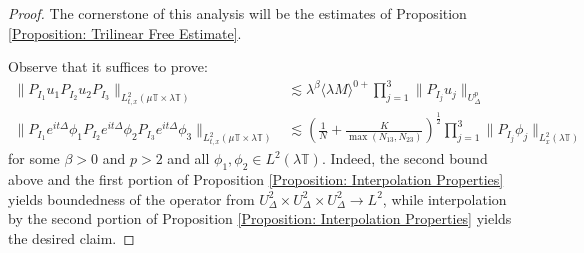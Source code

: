 \documentclass[12pt, letterpaper]{amsart}
\begin{document}
\begin{proof}
    The cornerstone of this analysis will be the estimates of Proposition \ref{Proposition: Trilinear Free Estimate}.

    Observe that it suffices to prove:
    \begin{align*}
        \|P_{I_1}u_1P_{I_2}u_2P_{I_3}\|_{L^2_{t,x}(\mu\mathbb{T}\times\lambda\mathbb{T})}&\lesssim \lambda^\beta \langle \lambda M\rangle^{0+}\prod_{j=1}^3\|P_{I_j}u_j\|_{U^p_\Delta}\\
        \|P_{I_1}e^{it\Delta}\phi_1P_{I_2}e^{it\Delta}\phi_2P_{I_3}e^{it\Delta}\phi_3\|_{L^2_{t,x}(\mu\mathbb{T}\times\lambda\mathbb{T})}&\lesssim \left(\frac{1}{N}+\frac{K}{\max(N_{13}, N_{23})}\right)^\frac{1}{2}\prod_{j=1}^3\|P_{I_j}\phi_j\|_{L^2_x(\lambda\mathbb{T})}
    \end{align*}
    for some $\beta > 0$ and $p > 2$ and all $\phi_1, \phi_2\in L^2(\lambda\mathbb{T})$. Indeed, the second bound above and the first portion of Proposition \ref{Proposition: Interpolation Properties} yields boundedness of the operator from $U^2_\Delta\times U^2_\Delta\times U^2_\Delta\to L^2$, while interpolation by the second portion of Proposition \ref{Proposition: Interpolation Properties} yields the desired claim.


\end{proof}
\end{document}
